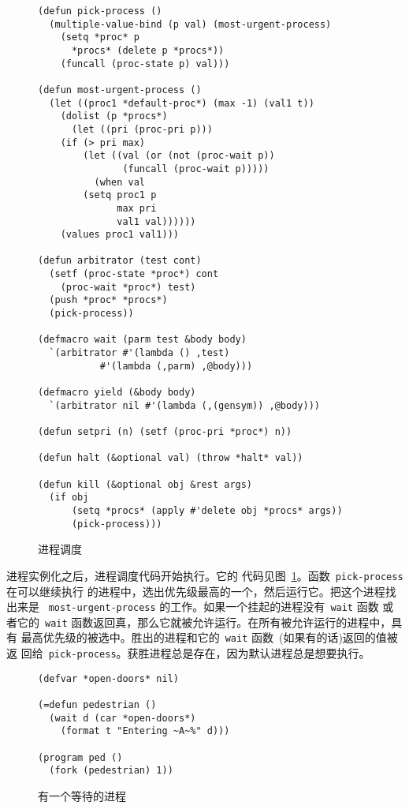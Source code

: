 \begin{figure}
\begin{lstlisting}
(defun pick-process ()
  (multiple-value-bind (p val) (most-urgent-process)
    (setq *proc* p
	  *procs* (delete p *procs*))
    (funcall (proc-state p) val)))

(defun most-urgent-process ()
  (let ((proc1 *default-proc*) (max -1) (val1 t))
    (dolist (p *procs*)
      (let ((pri (proc-pri p)))
	(if (> pri max)
	    (let ((val (or (not (proc-wait p))
			   (funcall (proc-wait p)))))
	      (when val
		(setq proc1 p
		      max pri
		      val1 val))))))
    (values proc1 val1)))

(defun arbitrator (test cont)
  (setf (proc-state *proc*) cont
	(proc-wait *proc*) test)
  (push *proc* *procs*)
  (pick-process))

(defmacro wait (parm test &body body)
  `(arbitrator #'(lambda () ,test)
	       #'(lambda (,parm) ,@body)))

(defmacro yield (&body body)
  `(arbitrator nil #'(lambda (,(gensym)) ,@body)))

(defun setpri (n) (setf (proc-pri *proc*) n))

(defun halt (&optional val) (throw *halt* val))

(defun kill (&optional obj &rest args)
  (if obj
      (setq *procs* (apply #'delete obj *procs* args))
      (pick-process)))
\end{lstlisting}
    \caption{进程调度}
    \label{fig:process_scheduling}
\end{figure}

进程实例化之后，进程调度代码开始执行。它的
代码见图~\ref{fig:process_scheduling}。函数~\texttt{pick-process} 在可以继续执行
的进程中，选出优先级最高的一个，然后运行它。把这个进程找出来是
~\texttt{most-urgent-process} 的工作。如果一个挂起的进程没有~\texttt{wait} 函数
或者它的~\texttt{wait} 函数返回真，那么它就被允许运行。在所有被允许运行的进程中，具有
最高优先级的被选中。胜出的进程和它的~\texttt{wait} 函数~(如果有的话)返回的值被返
回给~\texttt{pick-process}。获胜进程总是存在，因为默认进程总是想要执行。

\begin{figure}
\begin{lstlisting}
(defvar *open-doors* nil)

(=defun pedestrian ()
  (wait d (car *open-doors*)
    (format t "Entering ~A~%" d)))

(program ped ()	 
  (fork (pedestrian) 1))
\end{lstlisting}
\caption{有一个等待的进程}
\label{fig:one_process_with_one_wait}
\end{figure}

